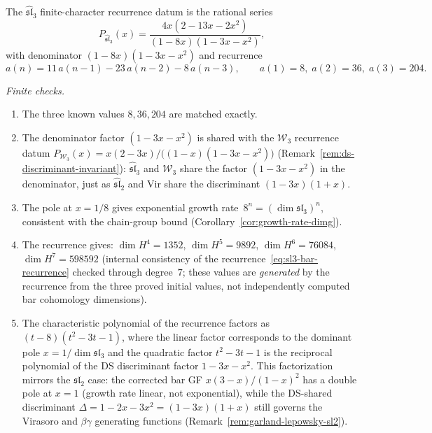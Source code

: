 \begin{hypothesis}\label{conj:sl3-bar-gf}
\label{hyp:sl3-finite-character-recurrence}
The $\widehat{\mathfrak{sl}}_3$ finite-character recurrence datum is the
rational series
\begin{equation}\label{eq:sl3-bar-gf}
P_{\widehat{\mathfrak{sl}}_3}(x)
= \frac{4x(2 - 13x - 2x^2)}{(1 - 8x)(1 - 3x - x^2)},
\end{equation}
with denominator $(1-8x)(1-3x-x^2)$ and recurrence
\begin{equation}\label{eq:sl3-bar-recurrence}
a(n) = 11\,a(n{-}1) - 23\,a(n{-}2) - 8\,a(n{-}3),
\qquad a(1) = 8,\; a(2) = 36,\; a(3) = 204.
\end{equation}

\emph{Finite checks.}

\begin{enumerate}[label=\textup{(\roman*)}]
\item The three known values $8, 36, 204$ are matched exactly.
\item The denominator factor $(1-3x-x^2)$ is shared with the
$\mathcal{W}_3$ recurrence datum
$P_{\mathcal{W}_3}(x) = x(2-3x)/\bigl((1-x)(1-3x-x^2)\bigr)$
(Remark~\ref{rem:ds-discriminant-invariant}):
$\widehat{\mathfrak{sl}}_3$ and $\mathcal{W}_3$ share the
factor $(1-3x-x^2)$ in the denominator, just as
$\widehat{\mathfrak{sl}}_2$ and $\mathrm{Vir}$ share the
discriminant $(1-3x)(1+x)$.
\item The pole at $x = 1/8$ gives exponential growth rate~$8^n = (\dim\mathfrak{sl}_3)^n$,
consistent with the chain-group bound
(Corollary~\ref{cor:growth-rate-dimg}).
\item The recurrence gives:
 $\dim H^4 = 1352$, $\dim H^5 = 9892$, $\dim H^6 = 76084$,
 $\dim H^7 = 598592$
 (internal consistency of the recurrence~\eqref{eq:sl3-bar-recurrence}
 checked through degree~$7$; these values are \emph{generated} by the
 recurrence from the three proved initial values, not independently
 computed bar cohomology dimensions).
\item The characteristic polynomial of the recurrence factors as
$(t - 8)(t^2 - 3t - 1)$, where the linear factor corresponds to the
dominant pole $x = 1/\dim\mathfrak{sl}_3$ and the quadratic factor
$t^2 - 3t - 1$ is the reciprocal polynomial of the DS discriminant
factor $1 - 3x - x^2$. This factorization mirrors the $\mathfrak{sl}_2$
case: the corrected bar GF $x(3{-}x)/(1{-}x)^2$ has
a double pole at $x = 1$ (growth rate linear, not exponential),
while the DS-shared discriminant
$\Delta = 1 - 2x - 3x^2 = (1-3x)(1+x)$
still governs the Virasoro and $\beta\gamma$ generating functions
(Remark~\ref{rem:garland-lepowsky-sl2}).
\end{enumerate}


\end{hypothesis}
